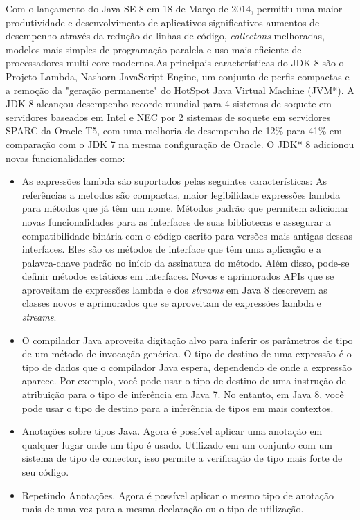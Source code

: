 Com o lançamento do Java SE 8 em 18 de Março de 2014, permitiu uma maior produtividade e desenvolvimento de aplicativos significativos aumentos de desempenho através da redução de linhas de código, {\it collectons} melhoradas, modelos mais simples de programação paralela e uso mais eficiente de processadores multi-core modernos.As principais características do JDK 8 são o Projeto Lambda, Nashorn JavaScript Engine, um conjunto de perfis compactas e a remoção da "geração permanente" do HotSpot Java Virtual Machine (JVM*). A JDK 8 alcançou desempenho recorde mundial para 4 sistemas de soquete em servidores baseados em Intel e NEC por 2 sistemas de soquete em servidores SPARC da Oracle T5, com uma melhoria de desempenho de 12\% para 41\% em comparação com o JDK 7 na mesma configuração de Oracle.
O JDK* 8 adicionou novas funcionalidades como:
  \begin{itemize}
  \item As expressões lambda são suportados pelas seguintes características: As referências a metodos são compactas, maior legibilidade expressões lambda para métodos que já têm um nome. Métodos padrão que permitem adicionar novas funcionalidades para as interfaces de suas bibliotecas e assegurar a compatibilidade binária com o código escrito para versões mais antigas dessas interfaces. Eles são os métodos de interface que têm uma aplicação e a palavra-chave padrão no início da assinatura do método. Além disso, pode-se definir métodos estáticos em interfaces. Novos e aprimorados APIs que se aproveitam de expressões lambda e dos {\it streams} em Java 8 descrevem as classes novos e aprimorados que se aproveitam de expressões lambda e {\it streams}.
  \item O compilador Java aproveita digitação alvo para inferir os parâmetros de tipo de um método de invocação genérica. O tipo de destino de uma expressão é o tipo de dados que o compilador Java espera, dependendo de onde a expressão aparece. Por exemplo, você pode usar o tipo de destino de uma instrução de atribuição para o tipo de inferência em Java 7. No entanto, em Java 8, você pode usar o tipo de destino para a inferência de tipos em mais contextos.
  \item Anotações sobre tipos Java. Agora é possível aplicar uma anotação em qualquer lugar onde um tipo é usado. Utilizado em um conjunto com um sistema de tipo de conector, isso permite a verificação de tipo mais forte de seu código.
  \item  Repetindo Anotações. Agora é possível aplicar o mesmo tipo de anotação mais de uma vez para a mesma declaração ou o tipo de utilização.\\
  \end{itemize}


								
